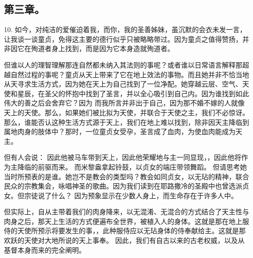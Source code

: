 
\subsection{第三章。}

\par

10. 如今，对纯洁的爱催迫着我，而你，我的圣善姊妹，虽沉默的会衣未发一言，让我谈一谈童贞，免得这主要的德行似乎只被略略带过。因为童贞之值得赞扬，并非因它在殉道者身上找到，而是因为它本身造就殉道者。\par

但谁以人的理智理解那连自然都未纳入其法则的事呢？或者谁以日常语言解释那超越自然过程的事呢？童贞从天上带来了它在地上效法的事物。而且她并非不恰当地从天寻求生活方式，因为她在天上为自己找到了一位净配。她穿越云层、空气、天使和星辰，在圣父的怀抱中找到了圣言，并以全心吸引到自己内。因为谁找到如此伟大的善之后会舍弃它？因为 而我所言并非出于自己，因为那不婚不嫁的人就像天上的天使。那么，如果她们被比拟为天使，并联合于天使之主，我们不必惊讶。那么，谁能否认这种生活方式源于天上，我们在地上难以找到，除非因天主降临到属地肉身的肢体中？那时，一位童贞女受孕，圣言成了血肉，为使血肉能成为天主。\par

但有人会说： 因此他被马车带到天上，因此他荣耀地与主一同显现，，因此他将作为主降临的前驱而来。 而米黎盎拿起铃鼓，以贞女的端庄带领舞蹈。 但请思考她当时所预表的是谁。她岂不是教会的类型吗？教会如同贞女，以无玷的精神，联合民众的宗教集会，咏唱神圣的歌曲。因为我们读到在耶路撒冷的圣殿中也曾选派贞女。但宗徒说了什么？  因为预象显示在少数人身上，而生命存在于许多人中。\par

但实际上，自从主带着我们的肉身降来，以无混淆、无混合的方式结合了天主性与肉身之后，那天上生活的方式便遍布全世界，被植入人的身体。这就是那在地上服侍的天使所预示将要发生的事，，此种服侍应以无玷身体的侍奉献给主。这就是那欢跃的天使对大地所说的天上事奉。 因此，我们有自古以来的古老权威，以及从基督本身而来的完全阐明。\par

